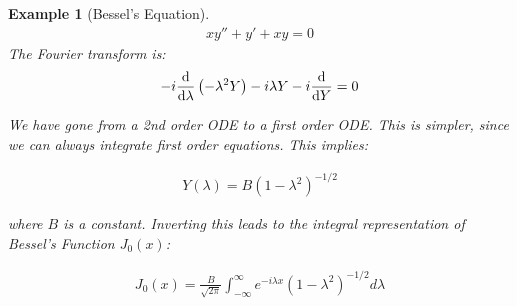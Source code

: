 \documentclass{article}
\newtheorem{ex}{Example}
\theoremstyle{definition}
\begin{document}
\begin{ex}[Bessel's Equation]
\begin{align*}
xy'' + y' + xy = 0
\end{align*}
The Fourier transform is:
\begin{align*}
-i \dv{\lambda} \left(- \lambda^2 Y\right) - i \lambda Y - i \dv{Y} = 0
\end{align*}

We have gone from a 2nd order ODE to a first order ODE. This is simpler, since we can always integrate first order equations. This implies:

\begin{align*}
Y(\lambda) = B(1-\lambda^2)^{-1/2}
\end{align*}

where $B$ is a constant. Inverting this leads to the integral representation of Bessel's Function $J_0(x)$:

\begin{align*}
J_0(x) = \frac{B}{\sqrt{2\pi}} \int_{-\infty}^{\infty} e^{- i \lambda x}(1-\lambda^2)^{-1/2} d\lambda 
\end{align*}
\end{ex}
\end{document}
